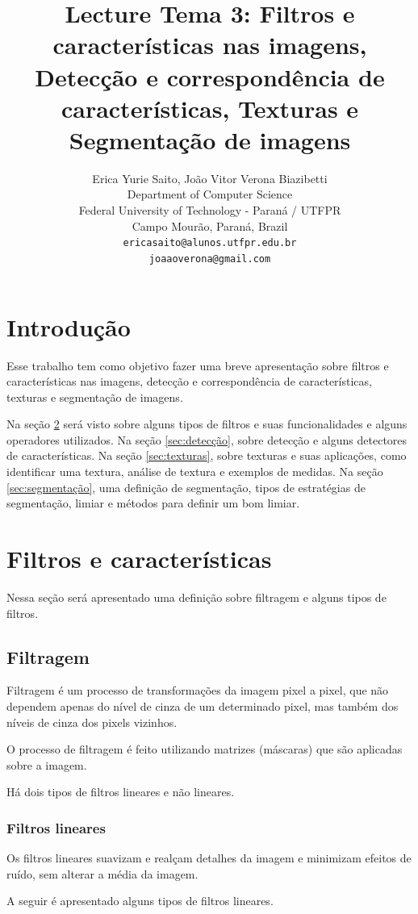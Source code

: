 \documentclass{article}
\title{Lecture Tema 3: Filtros e características nas imagens, Detecção e correspondência de características, Texturas e Segmentação de imagens}
\author{
  Erica Yurie Saito, João Vitor Verona Biazibetti \\
  Department of Computer Science\\
  Federal University of Technology - Paran\'{a} / UTFPR\\
  Campo Mour\~{a}o, Paran\'{a}, Brazil \\
  \texttt{ericasaito@alunos.utfpr.edu.br}\\
  \texttt{joaaoverona@gmail.com} \\
}
\begin{document}
\maketitle

\section{Introdução}
Esse trabalho tem como objetivo fazer uma breve apresentação sobre filtros e características nas imagens, detecção e correspondência de características, texturas e segmentação de imagens.  \par Na seção \ref{sec:filtros} será visto sobre alguns tipos de filtros e suas funcionalidades e alguns operadores utilizados. Na seção \ref{sec:detecção}, sobre detecção e alguns detectores de características. Na seção \ref{sec:texturas}, sobre texturas e suas aplicações, como identificar uma textura, análise de textura e exemplos de medidas. Na seção \ref{sec:segmentação}, uma definição de segmentação, tipos de estratégias de segmentação, limiar e métodos para definir um bom limiar. 

\section{Filtros e características}
\label{sec:filtros}
Nessa seção será apresentado uma definição sobre filtragem e alguns tipos de filtros. 
\subsection{Filtragem}
Filtragem é um processo de transformações da imagem pixel a pixel, que não dependem apenas do nível de cinza de um determinado pixel, mas também dos níveis de cinza dos pixels vizinhos. 
\par O processo de filtragem é feito utilizando matrizes (máscaras) que são aplicadas sobre a
imagem.
\par Há dois tipos de filtros lineares e não lineares.

\subsubsection{Filtros lineares}
Os filtros lineares suavizam e realçam detalhes da imagem e minimizam efeitos de ruído, sem alterar a média da imagem.
\par A seguir é apresentado alguns tipos de filtros lineares.
\end{document}
